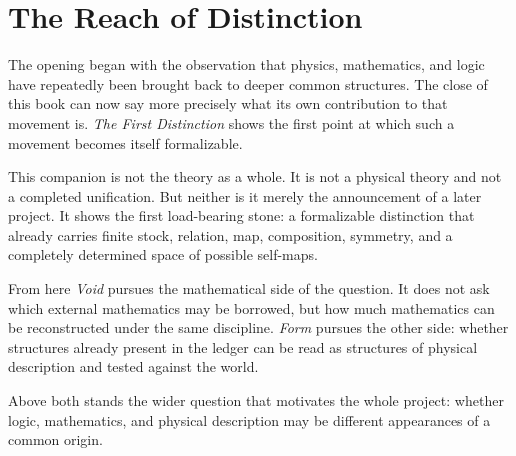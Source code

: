 \documentclass[11pt,a4paper]{book}
\begin{document}
\chapter{The Reach of Distinction}
\label{ch:outlook}
\label{ch:reach}

The opening began with the observation that physics, mathematics, and logic
have repeatedly been brought back to deeper common structures. The close of
this book can now say more precisely what its own contribution to that
movement is. \textit{The First Distinction} shows the first point at which
such a movement becomes itself formalizable.

This companion is not the theory as a whole. It is not a physical theory and
not a completed unification. But neither is it merely the announcement of a
later project. It shows the first load-bearing stone: a formalizable
distinction that already carries finite stock, relation, map, composition,
symmetry, and a completely determined space of possible self-maps.

From here \textit{Void} pursues the mathematical side of the question. It
does not ask which external mathematics may be borrowed, but how much
mathematics can be reconstructed under the same discipline. \textit{Form}
pursues the other side: whether structures already present in the ledger can
be read as structures of physical description and tested against the world.

Above both stands the wider question that motivates the whole project:
whether logic, mathematics, and physical description may be different
appearances of a common origin.

\begin{center}
\end{center}
\end{document}
